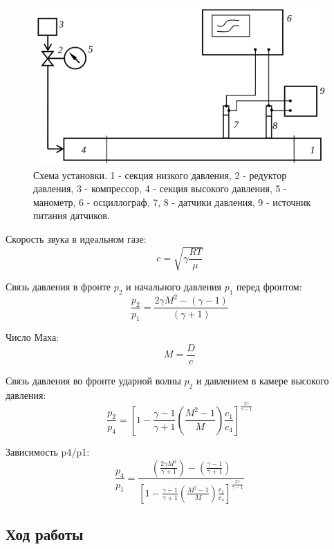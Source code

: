 \documentclass[a4paper,14pt]{article}
\begin{document}
\begin{figure}[h]
    \centering
    \includegraphics[scale=0.5]{scheme.png}
    \caption{Схема установки. 1 - секция низкого давления, 2 - редуктор давления, 3 - компрессор, 4 - секция высокого давления, 5 - манометр, 6 - осциллограф, 7, 8 - датчики давления, 9 - источник питания датчиков.}
\end{figure}

Скорость звука в идеальном газе:
$$
c = \sqrt{\gamma\frac{RT}{\mu}}
$$

Связь давления в фронте $p_2$ и начального давления $p_1$ перед фронтом:
\begin{equation}
    \frac{p_2}{p_1} = \frac{2\gamma M^2 - (\gamma-1)}{(\gamma+1)}
\end{equation}

Число Маха:
\begin{equation}
    M =\frac{D}{c}
\end{equation}

\clearpage

Связь давления во фронте ударной волны $p_2$ и давлением в камере высокого давления:
\begin{equation}
    \frac{p_2}{p_4} = \left[ 1-\frac{\gamma-1}{\gamma+1} \left( \frac{M^2-1}{M} \right) \frac{c_1}{c_4} \right]^\frac{2\gamma}{\gamma-1}
\end{equation}

Зависимость p4/p1:
\begin{equation}
    \frac{p_4}{p_1} = \frac{\left(\frac{2\gamma M^2}{\gamma + 1}\right)-\left(\frac{\gamma-1}{\gamma+1}\right)}{\left[ 1-\frac{\gamma-1}{\gamma+1} \left( \frac{M^2-1}{M} \right) \frac{c_1}{c_4} \right]^\frac{2\gamma}{\gamma-1}}
\end{equation}

\subsection{Ход работы}
\end{document}
